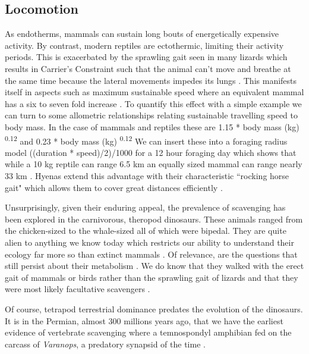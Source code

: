 \documentclass[a4paper,12pt]{article}
\begin{document}
\subsection*{Locomotion}
As endotherms, mammals can sustain long bouts of energetically expensive activity. 
By contrast, modern reptiles are ectothermic, limiting their activity periods.
This is exacerbated by the sprawling gait seen in many lizards which results in Carrier's Constraint such that the animal can't move and breathe at the same time because the lateral movements impedes its lungs \citep{carrier1987evolution}.
This manifests itself in aspects such as maximum sustainable speed where an equivalent mammal has a six to seven fold increase \citep{ruben1995evolution}.
To quantify this effect with a simple example we can turn to some allometric relationships relating sustainable travelling speed to body mass.
In the case of mammals and reptiles these are 1.15 * body mass (kg) \textsuperscript{0.12} and 0.23 * body mass (kg) \textsuperscript{0.12}
We can insert these into a foraging radius model ((duration * speed)/2)/1000 for a 12 hour foraging day which shows that while a 10 kg reptile can range 6.5 km an equally sized mammal can range nearly 33 km \citep{Enstipp2006Energetics}.
Hyenas extend this advantage with their characteristic ``rocking horse gait"  which allows them to cover great distances efficiently \citep{jones2015african}.

Unsurprisingly, given their enduring appeal, the prevalence of scavenging has been explored in the carnivorous, theropod dinosaurs.
These animals ranged from the chicken-sized to the whale-sized all of which were bipedal.
They are quite alien to anything we know today which restricts our ability to understand their ecology far more so than extinct mammals \citep{weishampel2004dinosauria}.
Of relevance, are the questions that still persist about their metabolism \citep{grady2014evidence}. 
We do know that they walked with the erect gait of mammals or birds rather than the sprawling gait of lizards and that they were most likely facultative scavengers \citep{weishampel2004dinosauria,depalma2013physical}.

Of course, tetrapod terrestrial dominance predates the evolution of the dinosaurs.
It is in the Permian, almost 300 millions years ago, that we have the earliest evidence of vertebrate scavenging where a temnospondyl amphibian fed on the carcass of \textit{Varanops}, a predatory synapsid of the time \citep{reisz2006articulated}.
\end{document}
